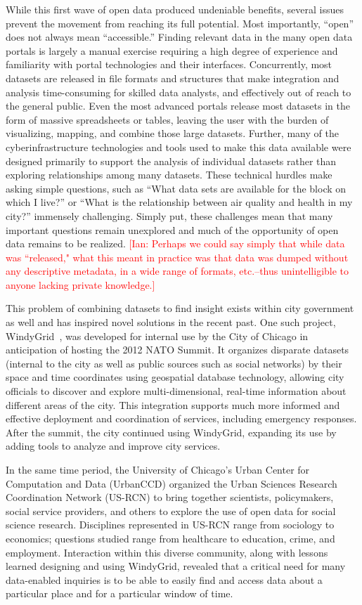 \documentclass[11pt]{article}
\newcommand{\ian}[1]{\textcolor{Red}{[Ian: #1]}}
\newcommand{\ian}[1]{}
\begin{document}
While this first wave of open data produced undeniable benefits, several issues prevent the movement from reaching its full potential. Most importantly, ``open'' does not always mean ``accessible.'' Finding relevant data in the many open data portals is largely a manual exercise requiring a high degree of experience and familiarity with portal technologies and their interfaces. Concurrently, most datasets are released in file formats and structures that make integration and analysis time-consuming for skilled data analysts, and effectively out of reach to the general public. Even the most advanced portals release most datasets in the form of massive spreadsheets or tables, leaving the user with the burden of visualizing, mapping, and combine those large datasets. Further, many of the cyberinfrastructure technologies and tools used to make this data available were designed primarily to support the analysis of individual datasets rather than exploring relationships among many datasets. These technical hurdles make asking simple questions, such as ``What data sets are available for the block on which I live?'' or ``What is the relationship between air quality and health in my city?'' immensely challenging. Simply put, these challenges mean that many important questions remain unexplored and much of the opportunity of open data remains to be realized.
\ian{Perhaps we could say simply that while data was ``released," what this meant in practice was that data was dumped without any descriptive metadata, in a wide range of formats, etc.--thus unintelligible to anyone lacking private knowledge.}

This problem of combining datasets to find insight exists within city government as well and has inspired novel solutions in the recent past. 
One such project, WindyGrid~\cite{windygrid}, was developed for internal use by the City of Chicago in anticipation of hosting the 2012 NATO Summit. It organizes disparate datasets (internal to the city as well as public sources such as social networks) by their space and time coordinates using geospatial database technology, allowing city officials to discover and explore multi-dimensional, real-time information about different areas of the city. This integration supports much more informed and effective deployment and coordination of services, including emergency responses. After the summit, the city continued using WindyGrid, expanding its use by adding tools to analyze and improve city services.

In the same time period, the University of Chicago's Urban Center for Computation and Data (UrbanCCD) \cite{urbanccd} organized the Urban Sciences Research Coordination Network (US-RCN) \cite{us-rcn} to bring together scientists, policymakers, social service providers, and others to explore the use of open data for social science research. Disciplines represented in US-RCN range from sociology to economics; questions studied range from healthcare to education, crime, and employment. Interaction within this diverse community, along with lessons learned designing and using WindyGrid, revealed that a critical need for many data-enabled inquiries is to be able to easily find and access data about a particular place and for a particular window of time.
\end{document}
